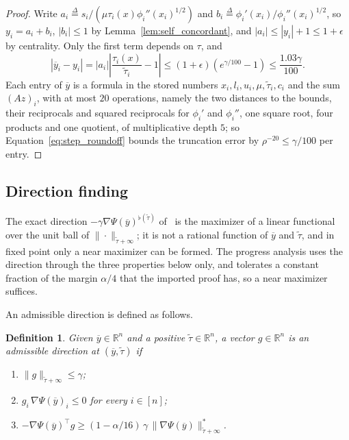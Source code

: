 \documentclass[11pt]{article}
\newtheorem{definition}{Definition}[section]
\newcommand{\R}{\mathbb R}
\newcommand{\tautil}{\widetilde{\tau}}
\newcommand{\defeq}{\stackrel{\Delta}{=}}
\begin{document}
\begin{proof}
Write $a_i \defeq s_i / (\mu \tau_i(x) \phi_i''(x_i)^{1/2})$ and
$b_i \defeq \phi_i'(x_i) / \phi_i''(x_i)^{1/2}$, so
$y_i = a_i + b_i$,
$|b_i| \le 1$ by Lemma~\ref{lem:self_concordant}, and
$|a_i| \le |y_i| + 1 \le 1 + \epsilon$ by centrality.
Only the first term depends on $\tau$, and
\[
\left| \overline{y}_i - y_i \right|
=
|a_i| \left| \frac{\tau_i(x)}{\tautil_i} - 1 \right|
\le
(1 + \epsilon) \left( e^{\gamma / 100} - 1 \right)
\le
\frac{1.03 \gamma}{100} .
\]
Each entry of $\overline{y}$ is a formula in the stored numbers
$x_i, l_i, u_i, \mu, \tautil_i, c_i$ and the sum
$(A z)_i$, with at most
$20$ operations, namely the two distances to the bounds, their reciprocals and
squared reciprocals for $\phi_i'$ and
$\phi_i''$, one square root, four products and one quotient, of multiplicative
depth $5$; so Equation~\eqref{eq:step_roundoff} bounds the truncation error by
$\rho^{-20} \le \gamma / 100$ per entry.
\end{proof}

\subsection{Direction finding}

The exact direction $-\gamma \nabla \Psi(\overline{y})^{\flat(\tautil)}$
of~\cite{BLLSSSW21} is the maximizer of a
linear functional over the unit ball of $\|\cdot\|_{\tautil + \infty}$; it is
not a rational function of $\overline{y}$ and
$\tautil$, and in fixed point only a near maximizer can be formed.
The progress analysis uses the direction through the three properties below
only, and tolerates a constant fraction of the margin $\alpha / 4$ that the
imported proof has, so a near maximizer suffices.

An admissible direction is defined as follows.

\begin{definition}
\label{def:admissible}
Given $\overline{y} \in \R^{n}$ and a positive
$\tautil \in \R^{n}$, a vector
$g \in \R^{n}$ is an \emph{admissible direction} at
$(\overline{y}, \tautil)$ if
\begin{enumerate}
\item \label{itm:admissible:1} $\|g\|_{\tautil + \infty} \le \gamma$;
\item \label{itm:admissible:2} $g_i \, \nabla \Psi(\overline{y})_i \le 0$ for
  every $i \in [n]$;
\item \label{itm:admissible:3}
  $- \nabla \Psi(\overline{y})^\top g \ge (1 - \alpha / 16) \, \gamma \, \|\nabla \Psi(\overline{y})\|^{*}_{\tautil + \infty}$.
\end{enumerate}
\end{definition}
\end{document}
